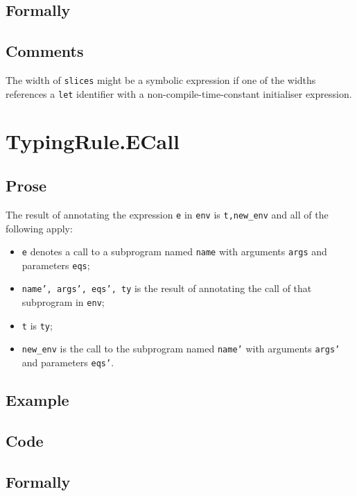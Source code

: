 \documentclass{book}
\begin{document}
\begin{emptyformal}
    \subsection{Formally}
\end{emptyformal}

\subsection{Comments}
    The width of \texttt{slices} might be a symbolic expression if one of the
widths references a \texttt{let} identifier with a non-compile-time-constant initialiser
expression.

\section{TypingRule.ECall \label{sec:TypingRule.ECall}}

  \subsection{Prose}
  The result of annotating the expression \texttt{e} in \texttt{env} is
\texttt{t,new\_env} and all of the following apply:
  \begin{itemize}
  \item \texttt{e} denotes a call to a subprogram named \texttt{name} with arguments \texttt{args} and
    parameters \texttt{eqs};
  \item \texttt{name', args', eqs', ty} is the result of annotating the call of
    that subprogram in \texttt{env};
  \item \texttt{t} is \texttt{ty};
  \item \texttt{new\_env} is the call to the subprogram named \texttt{name'} with arguments \texttt{args'}
    and parameters \texttt{eqs'}.
  \end{itemize}

  \subsection{Example}

  \subsection{Code}

\begin{emptyformal}
    \subsection{Formally}
\end{emptyformal}
\end{document}
